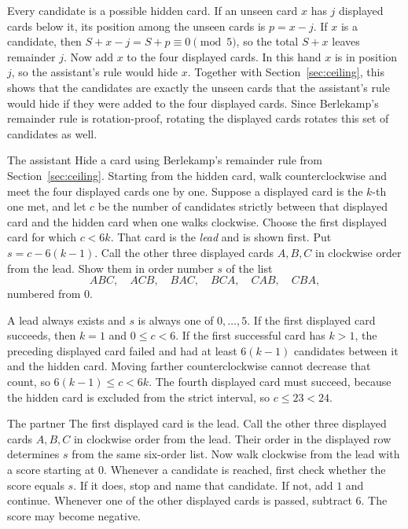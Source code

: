 \documentclass[11pt]{article}
\begin{document}
Every candidate is a possible hidden card. If an unseen card $x$ has $j$ displayed cards below it, its position among the unseen cards is $p=x-j$. If $x$ is a candidate, then $S+x-j=S+p\equiv0\pmod5$, so the total $S+x$ leaves remainder $j$. Now add $x$ to the four displayed cards. In this hand $x$ is in position $j$, so the assistant's rule would hide $x$. Together with Section~\ref{sec:ceiling}, this shows that the candidates are exactly the unseen cards that the assistant's rule would hide if they were added to the four displayed cards. Since Berlekamp's remainder rule is rotation-proof, rotating the displayed cards rotates this set of candidates as well.



\begin{rulebox}{The assistant}
Hide a card using Berlekamp's remainder rule from
Section~\ref{sec:ceiling}. Starting from the hidden card, walk
counterclockwise and meet the four displayed cards one by one. Suppose
a displayed card is the $k$-th one met, and let $c$ be the number of
candidates strictly between that displayed card and the hidden card
when one walks clockwise. Choose the first displayed card for which
$c<6k$. That card is the \emph{lead} and is shown first. Put
$s=c-6(k-1)$. Call the other three displayed cards $A,B,C$ in clockwise
order from the lead. Show them in order number $s$ of
the list
\[
ABC,\quad ACB,\quad BAC,\quad BCA,\quad CAB,\quad CBA,
\]
numbered from $0$.
\end{rulebox}

A lead always exists and $s$ is always one of $0,\ldots,5$. If the first displayed card succeeds, then $k=1$ and $0\leq c<6$. If the first successful card has $k>1$, the preceding displayed card failed and had at least $6(k-1)$ candidates between it and the hidden card. Moving farther counterclockwise cannot decrease that count, so $6(k-1)\leq c<6k$. The fourth displayed card must succeed, because the hidden card is excluded from the strict interval, so $c\leq 23<24$.

\begin{rulebox}{The partner}
The first displayed card is the lead. Call the other three
displayed cards $A,B,C$ in clockwise order from the lead.
Their order in the displayed row determines $s$ from the
same six-order list.
Now walk clockwise from the lead with a score starting at $0$. Whenever a candidate is reached, first check whether the score equals $s$. If it does, stop and name that candidate. If not, add $1$ and continue. Whenever one of the other displayed cards is passed, subtract $6$. The score may become negative.
\end{rulebox}
\end{document}
